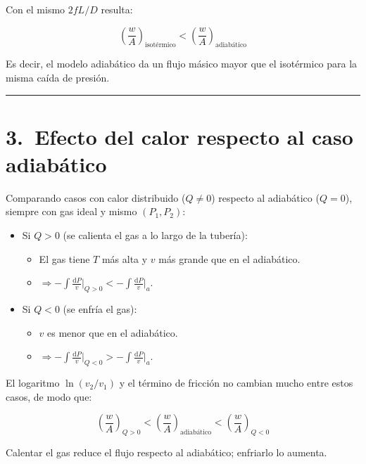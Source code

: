 \documentclass[11pt,a4paper]{article}
\begin{document}
Con el mismo \(2fL/D\) resulta:

\begin{equation}
\boxed{
\left(\frac{w}{A}\right)_{\text{isotérmico}}
<
\left(\frac{w}{A}\right)_{\text{adiabático}}
}
\end{equation}

Es decir, el modelo adiabático da un flujo másico mayor que el isotérmico para la misma caída de presión.

\bigskip
\hrule
\bigskip

\section*{3.\ Efecto del calor respecto al caso adiabático}

Comparando casos con calor distribuido (\(Q\neq 0\)) respecto al adiabático
(\(Q=0\)), siempre con gas ideal y mismo \((P_1,P_2)\):

\begin{itemize}
  \item Si \(Q>0\) (se calienta el gas a lo largo de la tubería):
  \begin{itemize}
    \item El gas tiene \(T\) más alta y \(v\) más grande que en el adiabático.
    \item \(\Rightarrow -\displaystyle\int \frac{\mathrm dP}{v}\big|_{Q>0}
              < -\displaystyle\int \frac{\mathrm dP}{v}\big|_{a}.\)
  \end{itemize}
  \item Si \(Q<0\) (se enfría el gas):
  \begin{itemize}
    \item \(v\) es menor que en el adiabático.
    \item \(\Rightarrow -\displaystyle\int \frac{\mathrm dP}{v}\big|_{Q<0}
              > -\displaystyle\int \frac{\mathrm dP}{v}\big|_{a}.\)
  \end{itemize}
\end{itemize}

El logaritmo \(\ln(v_2/v_1)\) y el término de fricción no cambian mucho entre estos casos, de modo que:

\begin{equation}
\boxed{
\left(\frac{w}{A}\right)_{Q>0}
<
\left(\frac{w}{A}\right)_{\text{adiabático}}
<
\left(\frac{w}{A}\right)_{Q<0}
}
\end{equation}

Calentar el gas reduce el flujo respecto al adiabático; enfriarlo lo aumenta.
\end{document}
